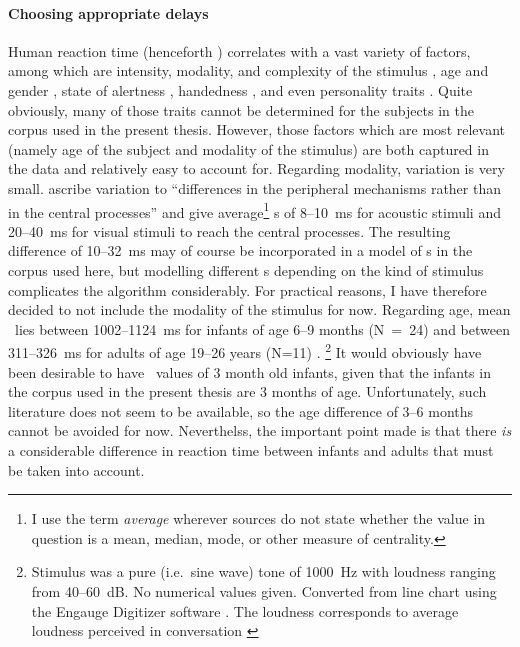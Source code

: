 \paragraph{Choosing appropriate delays}  %
Human reaction time (henceforth \rt) correlates with a vast variety of factors, among which are intensity, modality, and complexity of the stimulus \citep{brebner80}, age and gender \citep{der06}, state of alertness \citep{appelle74}, handedness \citep{dane03}, and even personality traits \citep{stelmack93}.
Quite obviously, many of those traits cannot be determined for the subjects in the corpus used in the present thesis.
However, those factors which are most relevant (namely age of the subject and modality of the stimulus) are both captured in the data and relatively easy to account for.
Regarding modality, variation is very small.
\citet[]{brebner80} ascribe variation to ``differences in the peripheral mechanisms rather than in the central processes'' and give average\footnote{I use the term \emph{average} wherever sources do not state whether the value in question is a mean, median, mode, or other measure of centrality.} \rt s of 8--10~ms for acoustic stimuli and 20--40~ms for visual stimuli to reach the central processes.
The resulting difference of 10--32~ms may of course be incorporated in a model of \rt s in the corpus used here, but modelling different \rt s depending on the kind of stimulus complicates the algorithm considerably.
For practical reasons, I have therefore decided to not include the modality of the stimulus for now.
Regarding age, mean \rt\ lies  between 1002--1124~ms for infants of age 6--9 months (N~=~24) and between 311--326~ms for adults of age 19--26 years (N=11) \citep[]{leibold02}.%
\footnote{Stimulus was a pure (i.e.~sine wave) tone of 1000~Hz with loudness ranging from 40--60~dB.
No numerical values given.
Converted from line chart using the Engauge Digitizer software \citep{mitchell02}.
The loudness corresponds to average loudness perceived in conversation \citep[]{goerne06}} It would obviously have been desirable to have \rt\ values of 3 month old infants, given that the infants in the  corpus used in the present thesis are 3 months of age.
Unfortunately, such literature does not seem to be available, so the age difference of 3--6 months cannot be avoided for now.
Neverthelss, the important point made is that there \emph{is} a considerable difference in reaction time between infants and adults that must be taken into account.
